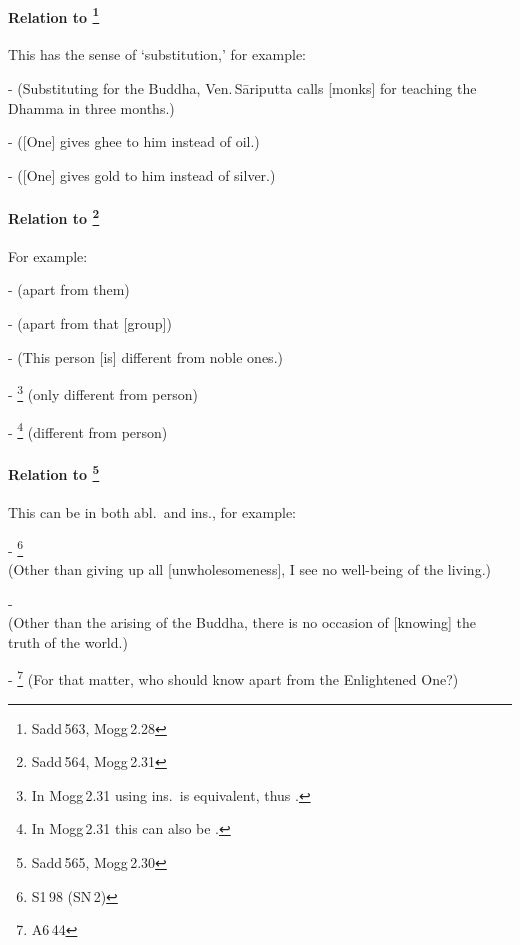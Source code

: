 \paragraph*{Relation to \footnote{Sadd\,563, Mogg\,2.28}} This has the sense of `substitution,' for example:\par
-  (Substituting for the Buddha, Ven.\,S\=ariputta calls [monks] for teaching the Dhamma in three months.)\par
-  ([One] gives ghee to him instead of oil.)\par
-  ([One] gives gold to him instead of silver.)\par

\paragraph*{Relation to \footnote{Sadd\,564, Mogg\,2.31}} For example:\par
-  (apart from them)\par
-  (apart from that [group])\par
-  (This person [is] different from noble ones.)\par
- \footnote{In Mogg\,2.31 using ins.\ is equivalent, thus .} (only different from person)\par
- \footnote{In Mogg\,2.31 this can also be .} (different from person)\par

\paragraph*{Relation to \footnote{Sadd\,565, Mogg\,2.30}} This can be in both abl.\ and ins., for example:\par
- \footnote{S1\,98 (SN\,2)} \\(Other than giving up all [unwholesomeness], I see no well-being of the living.)\par
-  \\(Other than the arising of the Buddha, there is no occasion of [knowing] the truth of the world.)\par
- \footnote{A6\,44} (For that matter, who should know apart from the Enlightened One?)\par


